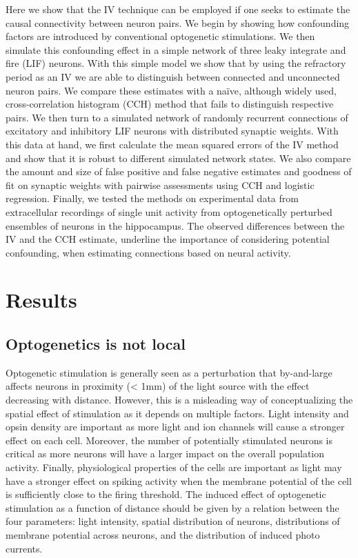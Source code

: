 \documentclass[11pt]{article}
\begin{document}
Here we show that the IV technique can be employed if one seeks to estimate the causal connectivity between neuron pairs. 
We begin by showing how confounding factors are introduced by conventional optogenetic stimulations. 
We then simulate this confounding effect in a simple network of three leaky integrate and fire (LIF) neurons. 
With this simple model we show that by using the refractory period as an IV we are able to distinguish between connected and unconnected neuron pairs. 
We compare these estimates with a na\"ive, although widely used, cross-correlation histogram (CCH) method that fails to distinguish respective pairs. 
We then turn to a simulated network of randomly recurrent connections of excitatory and inhibitory LIF neurons with distributed synaptic weights. 
With this data at hand, we first calculate the mean squared errors of the IV method and show that it is robust to different simulated network states. 
We also compare the amount and size of false positive and false negative estimates and goodness of fit on synaptic weights with pairwise assessments using CCH and logistic regression.
Finally, we tested the methods on experimental data from extracellular recordings of single unit activity from optogenetically perturbed ensembles of neurons in the hippocampus.
The observed differences between the IV and the CCH estimate, underline the importance of considering potential confounding, when estimating connections based on neural activity.

\section{Results}
\subsection{Optogenetics is not local}
Optogenetic stimulation is generally seen as a perturbation that by-and-large affects neurons in proximity (< 1mm) of the light source with the effect decreasing with distance. 
However, this is a misleading way of conceptualizing the spatial effect of stimulation as it depends on multiple factors. 
Light intensity and opsin density are important as more light and ion channels will cause a stronger effect on each cell. 
Moreover, the number of potentially stimulated neurons is critical as more neurons will have a larger impact on the overall population activity. 
Finally, physiological properties of the cells are important as light may have a stronger effect on spiking activity when the membrane potential of the cell is sufficiently close to the firing threshold. 
The induced effect of optogenetic stimulation as a function of distance should be given by a relation between the four parameters: light intensity, spatial distribution of neurons, distributions of membrane potential across neurons, and the distribution of induced photo currents.
\end{document}
